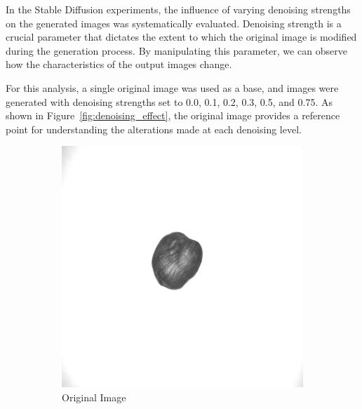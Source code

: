 \documentclass[12pt,DIV14,BCOR12mm,a4paper,footinclude=false,headinclude,parskip=half-,twoside,openright,cleardoublepage=empty,toc=index,bibliography=totoc,listof=totoc]{scrreprt}
\numberwithin{equation}{chapter}
\begin{document}
In the Stable Diffusion experiments, the influence of varying denoising strengths on the generated images was systematically evaluated. Denoising strength is a crucial parameter that dictates the extent to which the original image is modified during the generation process. By manipulating this parameter, we can observe how the characteristics of the output images change.

For this analysis, a single original image was used as a base, and images were generated with denoising strengths set to 0.0, 0.1, 0.2, 0.3, 0.5, and 0.75. As shown in Figure~\ref{fig:denoising_effect}, the original image provides a reference point for understanding the alterations made at each denoising level.
\begin{figure}
    \centering
    \begin{subfigure}{0.14\textwidth}
        \centering
        \includegraphics[width=\linewidth]{../media/image_original.png} %
        \caption{Original Image}
    \end{subfigure}
    \begin{subfigure}{0.14\textwidth}
        \centering

\end{subfigure}
\end{figure}
\end{document}
